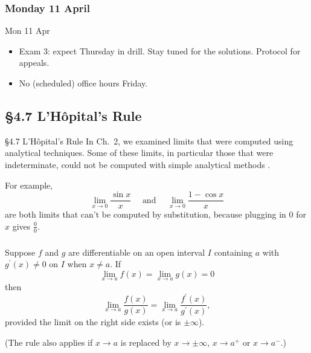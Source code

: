 \documentclass[cal1spr16Lectures.tex]{subfiles}
\begin{document}

\subsubsection{\bf Monday 11 April}

\begin{frame}[allowframebreaks]{Mon 11 Apr}
\begin{itemize}%
\item Exam 3: expect Thursday in drill.  Stay tuned for the solutions.  Protocol for appeals.
\item No (scheduled) office hours Friday.
\end{itemize}
\end{frame}

\subsection[4.7 L'H\^opital's Rule]{\S 4.7 L'H\^{o}pital's Rule}

\begin{frame}{\S 4.7 L'H\^{o}pital's Rule}
\small
In Ch.\ 2, we examined limits that were computed using analytical techniques.  Some of these limits, in particular those that were indeterminate, could not be computed with simple analytical methods%
.

\vspace{1pc}
For example, 
\vspace{-0.5pc}
\[\lim_{x \to 0} \frac{\sin x}{x}\quad\text{ and }\quad \lim_{x \to 0} \frac{1-\cos x}{x}\] 
are both limits that can't be computed by substitution, because plugging in 0 for $x$ gives $\frac{0}{0}$.
\end{frame}

\begin{frame}
\frametitle{}
\small
\begin{thm}
Suppose $f$ and $g$ are differentiable on an open interval $I$ containing $a$ with $g^{\prime}(x) \ne 0$ on $I$ when $x \ne a$.  If 
$$\lim_{x \to a} f(x)=\lim_{x \to a} g(x)=0$$
then
$$\lim_{x \to a} \frac{f(x)}{g(x)}=\lim_{x \to a} \frac{f^{\prime}(x)}{g^{\prime}(x)},$$
provided the limit on the right side exists (or is $\pm \infty$).
\end{thm}

\vspace{1pc}
(The rule also applies if $x \to a$ is replaced by $x \to \pm \infty$, $x \to a^+$ or $x \to a^-$.)
\end{frame}
\end{document}
